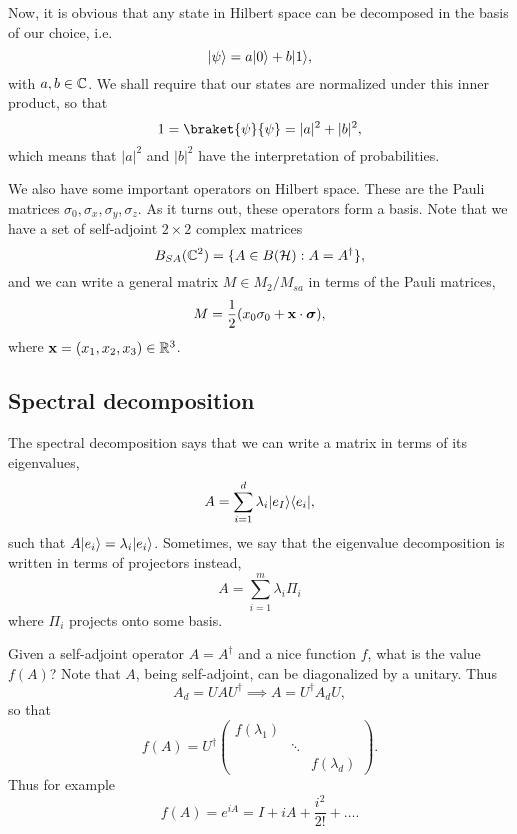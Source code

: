Now, it is obvious that any state in Hilbert space can be decomposed in the basis of our choice, i.e.
\begin{equation}
    \lvert\psi\rangle=a\lvert0\rangle+b\lvert1\rangle,
\end{equation}
with $a,b\in \mathbb{C}$. We shall require that our states are normalized under this inner product, so that
\begin{equation}
    1=\braket{\psi}{\psi}=|a|^2+|b|^2,
\end{equation}
which means that $|a|^2$ and $|b|^2$ have the interpretation of probabilities.

We also have some important operators on Hilbert space. These are the Pauli matrices%
$\sigma_0,\sigma_x,\sigma_y,\sigma_z$. As it turns out, these operators form a basis. Note that we have a set of self-adjoint $2\times 2$ complex matrices
\begin{equation}
    B_{SA}(\mathbb{C}^2)=\{A\in B(\mathcal H): A=A^\dagger\},
\end{equation}
and we can write a general matrix $M\in M_2 /M_{sa}$ in terms of the Pauli matrices,
\begin{equation}
    M=\frac{1}{2}(x_0 \sigma_0 +\boldsymbol{\mathbf{x}} \cdot \mbox{\boldmath$ \sigma $}),
\end{equation}
where $\boldsymbol{\mathbf{x}}=(x_1,x_2,x_3)\in \mathbb{R}^3$.

\subsection*{Spectral decomposition}
The spectral decomposition says that we can write a matrix in terms of its eigenvalues,
\begin{equation}
    A=\sum_{i=1}^d \lambda_i \lvert e_I\rangle\langle e_i\rvert,
\end{equation}
such that $A\lvert e_i\rangle=\lambda_i \lvert e_i\rangle$. Sometimes, we say that the eigenvalue decomposition is written in terms of projectors instead,
\begin{equation}
    A=\sum_{i=1}^m \lambda_i \Pi_i
\end{equation}
where $\Pi_i$ projects onto some basis.

Given a self-adjoint operator $A=A^\dagger$ and a nice function $f$, what is the value $f(A)$? Note that $A$, being self-adjoint, can be diagonalized by a unitary. Thus
\begin{equation}
    A_d = UAU^\dagger \implies A = U^\dagger A_d U,
\end{equation}
so that
\begin{equation}
    f(A)=U^\dagger \begin{pmatrix}
    f(\lambda_1) && \\
    & \ddots & \\
    && f(\lambda_d)
    \end{pmatrix}.
\end{equation}
Thus for example
\begin{equation*}
    f(A)=e^{iA}=I + iA +\frac{i^2}{2!}+\ldots.
\end{equation*}

